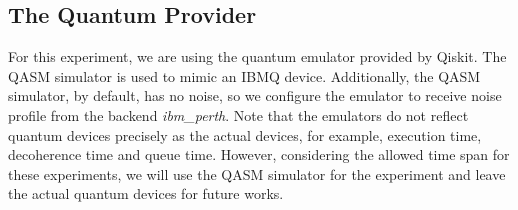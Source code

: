 \subsection{The Quantum Provider}
For this experiment, we are using the quantum emulator provided by Qiskit.
The QASM simulator is used to mimic an IBMQ device.
Additionally, the QASM simulator, by default, has no noise, so we configure the emulator to receive  noise profile from the backend \emph{ibm\_perth}.
Note that the emulators do not reflect quantum devices precisely as the actual devices, for example, execution time, decoherence time and queue time.
However, considering the allowed time span for these experiments, we will use the QASM simulator for the experiment and leave the actual quantum devices for future works.